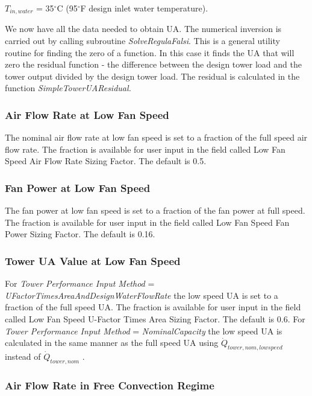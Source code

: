 \(T_{in,water}\) = 35\(^{\circ}\)C (95\(^{\circ}\)F design inlet water temperature).

We now have all the data needed to obtain UA. The numerical inversion is carried out by calling subroutine \emph{SolveRegulaFalsi}. This is a general utility routine for finding the zero of a function. In this case it finds the UA that will zero the residual function - the difference between the design tower load and the tower output divided by the design tower load. The residual is calculated in the function \emph{SimpleTowerUAResidual.}

\subsubsection{Air Flow Rate at Low Fan Speed}\label{air-flow-rate-at-low-fan-speed}

The nominal air flow rate at low fan speed is set to a fraction of the full speed air flow rate. The fraction is available for user input in the field called Low Fan Speed Air Flow Rate Sizing Factor. The default is 0.5.

\subsubsection{Fan Power at Low Fan Speed}\label{fan-power-at-low-fan-speed}

The fan power at low fan speed is set to a fraction of the fan power at full speed. The fraction is available for user input in the field called Low Fan Speed Fan Power Sizing Factor. The default is 0.16.

\subsubsection{Tower UA Value at Low Fan Speed}\label{tower-ua-value-at-low-fan-speed}

For \emph{Tower Performance Input Method} = \emph{UFactorTimesAreaAndDesignWaterFlowRate} the low speed UA is set to a fraction of the full speed UA. The fraction is available for user input in the field called Low Fan Speed U-Factor Times Area Sizing Factor. The default is 0.6. For \emph{Tower Performance Input Method} = \emph{NominalCapacity} the low speed UA is calculated in the same manner as the full speed UA using \(\dot Q_{tower,nom,lowspeed}\) instead of \(\dot Q_{tower,nom}\) .

\subsubsection{Air Flow Rate in Free Convection Regime}\label{air-flow-rate-in-free-convection-regime}

